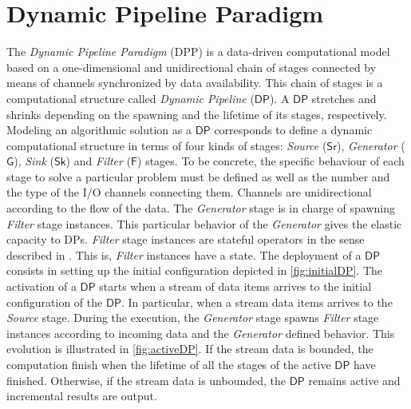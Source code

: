 \documentclass[preprint]{elsarticle}
\newcommand{\DP}{\mathsf{DP}}
\newcommand{\iwcc}{\mathsf{Sr}}
\newcommand{\owcc}{\mathsf{Sk}}
\newcommand{\fwcc}{\mathsf{F}}
\newcommand{\gwcc}{\mathsf{G}}
\begin{document}
\section{Dynamic Pipeline Paradigm}\label{sub:sec:dp:par}
%
The \textit{Dynamic Pipeline Paradigm} (DPP) \cite{dpdef} is a data-driven computational model  based on a one-dimensional and unidirectional chain of stages connected by means of channels synchronized by data availability. 
This chain of stages is a computational structure called \textit{Dynamic Pipeline} ($\DP$). A $\DP$ stretches and shrinks depending on the spawning and the lifetime of its stages, respectively. Modeling an algorithmic solution as a $\DP$ corresponds to define a dynamic computational structure  in terms of four kinds of stages:  \textit{Source} ($\iwcc$),  \textit{Generator} ($\gwcc$),  \textit{Sink} ($\owcc$) and \textit{Filter} ($\fwcc$) stages.  To be concrete, the specific  behaviour of each stage to solve a particular problem must be defined as well as the number and the type of the I/O channels connecting them. Channels are unidirectional according to the flow of the data. The \textit{Generator} stage is in charge of spawning \textit{Filter} stage instances. This particular behavior of the \textit{Generator}  gives the elastic capacity to DPs. \textit{Filter} stage instances are stateful operators in the sense described in \cite{HR19}. This is, \textit{Filter} instances have a state.  
The deployment of a $\DP$ consists in setting up the initial configuration depicted in \autoref{fig:initialDP}. The activation of a $\DP$ starts when a stream of data items arrives to the initial configuration of the $\DP$. In particular, when a stream data items arrives to the \textit{Source} stage. During the execution, the  \textit{Generator} stage spawns \textit{Filter} stage instances according to incoming data and the \textit{Generator} defined behavior. This evolution is illustrated in  \autoref{fig:activeDP}. If the stream  data is bounded, the computation finish when the lifetime of all the stages of the active $\DP$ have finished. Otherwise, if the stream data is unbounded, the $\DP$ remains active and incremental results are output. 
\end{document}
